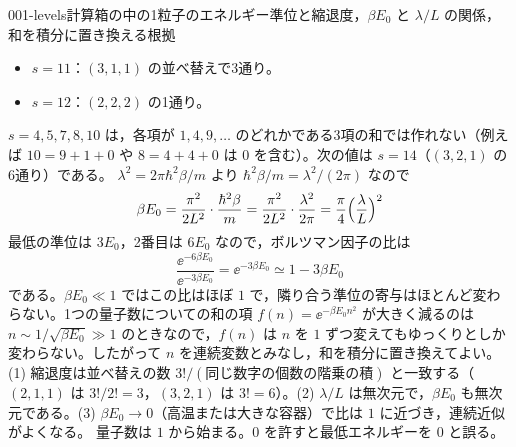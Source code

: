 \documentclass[uplatex,dvipdfmx,a4paper,11pt]{jsarticle}
\begin{document}
\begin{mondai}{001-levels}{計算}{箱の中の1粒子のエネルギー準位と縮退度，$\beta E_0$ と $\lambda/L$ の関係，和を積分に置き換える根拠}
\begin{tadashii}
\begin{itemize}
  \item $s=11$：$(3,1,1)$ の並べ替えで3通り。
  \item $s=12$：$(2,2,2)$ の1通り。
\end{itemize}
$s=4,5,7,8,10$ は，各項が $1,4,9,\dots$ のどれかである3項の和では作れない（例えば $10=9+1+0$ や $8=4+4+0$ は $0$ を含む）。次の値は $s=14$（$(3,2,1)$ の6通り）である。
 $\lambda^{2}=2\pi\hbar^{2}\beta/m$ より $\hbar^{2}\beta/m=\lambda^{2}/(2\pi)$ なので
\[ \beta E_0=\frac{\pi^{2}}{2L^{2}}\cdot\frac{\hbar^{2}\beta}{m}=\frac{\pi^{2}}{2L^{2}}\cdot\frac{\lambda^{2}}{2\pi}=\frac{\pi}{4}\Bigl(\frac{\lambda}{L}\Bigr)^{2} \]
 最低の準位は $3E_0$，2番目は $6E_0$ なので，ボルツマン因子の比は
\[ \frac{\ee^{-6\beta E_0}}{\ee^{-3\beta E_0}}=\ee^{-3\beta E_0}\simeq1-3\beta E_0 \]
である。$\beta E_0\ll1$ ではこの比はほぼ $1$ で，隣り合う準位の寄与はほとんど変わらない。1つの量子数についての和の項 $f(n)=\ee^{-\beta E_0n^{2}}$ が大きく減るのは $n\sim1/\sqrt{\beta E_0}\gg1$ のときなので，$f(n)$ は $n$ を $1$ ずつ変えてもゆっくりとしか変わらない。したがって $n$ を連続変数とみなし，和を積分に置き換えてよい。
\kenzan (1) 縮退度は並べ替えの数 $3!/(\text{同じ数字の個数の階乗の積})$ と一致する（$(2,1,1)$ は $3!/2!=3$，$(3,2,1)$ は $3!=6$）。(2) $\lambda/L$ は無次元で，$\beta E_0$ も無次元である。(3) $\beta E_0\to0$（高温または大きな容器）で比は $1$ に近づき，連続近似がよくなる。
\tsumazuki 量子数は $1$ から始まる。$0$ を許すと最低エネルギーを $0$ と誤る。
\end{tadashii}
\end{mondai}
\end{document}
